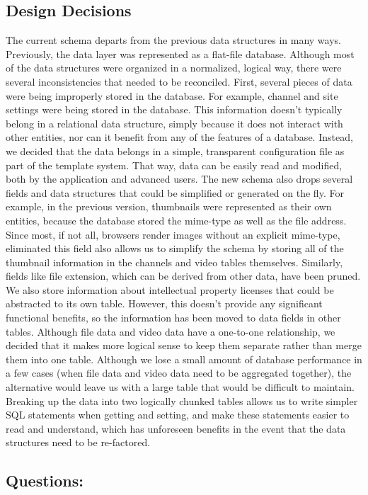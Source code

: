 \documentclass[a4paper,12pt]{report}
\begin{document}
\subsection{Design Decisions}
	The current schema departs from the previous data structures in many ways. Previously, the data layer was represented as a flat-file database. Although most of the data structures were organized in a normalized, logical way, there were several inconsistencies that needed to be reconciled.
	First, several pieces of data were being improperly stored in the database. For example, channel and site settings were being stored in the database. This information doesn't typically belong in a relational data structure, simply because it does not interact with other entities, nor can it benefit from any of the features of a database. Instead, we decided that the data belongs in a simple, transparent configuration file as part of the template system. That way, data can be easily read and modified, both by the application and advanced users. 
	The new schema also drops several fields and data structures that could be simplified or generated on the fly. For example, in the previous version, thumbnails were represented as their own entities, because the database stored the mime-type as well as the file address. Since most, if not all, browsers render images without an explicit mime-type, eliminated this field also allows us to simplify the schema by storing all of the thumbnail information in the channels and video tables themselves. Similarly, fields like file extension, which can be derived from other data, have been pruned. We also store information about intellectual property licenses that could be abstracted to its own table. However, this doesn't provide any significant functional benefits, so the information has been moved to data fields in other tables.
	Although file data and video data have a one-to-one relationship, we decided that it makes more logical sense to keep them separate rather than merge them into one table. Although we lose a small amount of database performance in a few cases (when file data and video data need to be aggregated together), the alternative would leave us with a large table that would be difficult to maintain. Breaking up the data into two logically chunked tables allows us to write simpler SQL statements when getting and setting, and make these statements easier to read and understand, which has unforeseen benefits in the event that the data structures need to be re-factored.

\subsection{Questions:}
\end{document}
